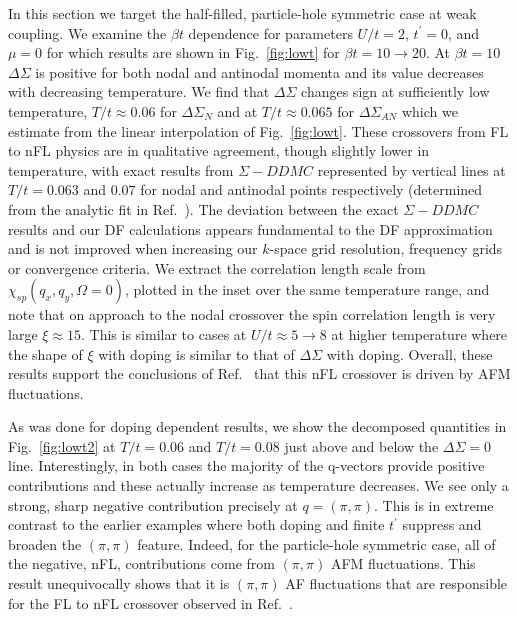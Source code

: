 \documentclass[twocolumn,notitlepage,prb,superscriptaddress,showpacs]{revtex4-1}
\begin{document}
In this section we target the half-filled, particle-hole symmetric case at weak coupling.  We examine the $\beta t$ dependence for parameters $U/t=2$, $t^\prime=0$, and $\mu=0$ for which results are shown in Fig.~\ref{fig:lowt} for $\beta t=10 \to 20$. 
At $\beta t=10$ $\Delta \Sigma$ is positive for both nodal and antinodal momenta and its value decreases with decreasing temperature.
 We find that $\Delta\Sigma$ changes sign at sufficiently low temperature, $T/t\approx0.06$ for $\Delta \Sigma_N$ and at $T/t\approx0.065$ for $\Delta \Sigma_{AN}$ which we estimate from the linear interpolation of Fig.~\ref{fig:lowt}.  
 These crossovers from FL to nFL physics are in qualitative agreement, though slightly lower in temperature, with exact results from $\Sigma-DDMC$\cite{simkovic:2019} represented by vertical lines at $T/t=0.063$ and $0.07$ for nodal and antinodal points respectively (determined from the analytic fit in Ref.~).  The deviation between the exact $\Sigma-DDMC$ results and our DF calculations appears fundamental to the DF approximation and is not improved when increasing our $k$-space grid resolution, frequency grids or convergence criteria.
We extract the correlation length scale from $\chi_{sp}(q_x,q_y,\Omega=0)$, plotted in the inset over the same temperature range, and note that on approach to the nodal crossover the spin correlation length is very large $\xi\approx 15$.  This is similar to cases at  $U/t \approx 5\to 8$ at higher temperature where the shape of $\xi$ with doping is similar to that of $\Delta \Sigma$ with doping.  Overall, these results support the conclusions of Ref.~ that this nFL crossover is driven by AFM fluctuations. 

As was done for doping dependent results, we show the decomposed quantities in Fig.~\ref{fig:lowt2} at $T/t=0.06$ and $T/t=0.08$ just above and below the $\Delta \Sigma=0$ line.  Interestingly, in both cases the majority of the q-vectors provide positive contributions and these actually increase as temperature decreases.  We see only a strong, sharp negative contribution precisely at $q=(\pi,\pi)$.  This is in extreme contrast to the earlier examples where both doping and finite $t^\prime$ suppress and broaden the $(\pi,\pi)$ feature.  Indeed, for the particle-hole symmetric case, all of the negative, nFL, contributions come from $(\pi,\pi)$ AFM fluctuations.  This result unequivocally shows that it is $(\pi,\pi)$ AF fluctuations that are responsible for the FL to nFL crossover observed in Ref.~.
\end{document}
